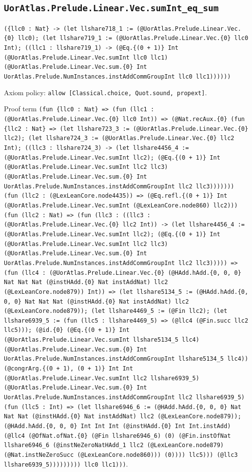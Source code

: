 \documentclass[11pt]{article}
\begin{document}
\subsection*{\texttt{UorAtlas.Prelude.Linear.Vec.sumInt\_eq\_sum}}
\noindent\texttt{(\{llc0 : Nat\} -> (let llshare718\_1 := (@UorAtlas.Prelude.Linear.Vec.\{0\} llc0); (let llshare719\_1 := (@UorAtlas.Prelude.Linear.Vec.\{0\} llc0 Int); ((llc1 : llshare719\_1) -> (@Eq.\{(0 + 1)\} Int (@UorAtlas.Prelude.Linear.Vec.sumInt llc0 llc1) (@UorAtlas.Prelude.Linear.Vec.sum.\{0\} Int UorAtlas.Prelude.NumInstances.instAddCommGroupInt llc0 llc1))))))}\par
\noindent Axiom policy: \texttt{allow [Classical.choice, Quot.sound, propext]}.\par
\noindent Proof term \texttt{(fun \{llc0 : Nat\} => (fun (llc1 : (@UorAtlas.Prelude.Linear.Vec.\{0\} llc0 Int)) => (@Nat.recAux.\{0\} (fun \{llc2 : Nat\} => (let llshare723\_3 := (@UorAtlas.Prelude.Linear.Vec.\{0\} llc2); (let llshare724\_3 := (@UorAtlas.Prelude.Linear.Vec.\{0\} llc2 Int); ((llc3 : llshare724\_3) -> (let llshare4456\_4 := (@UorAtlas.Prelude.Linear.Vec.sumInt llc2); (@Eq.\{(0 + 1)\} Int (@UorAtlas.Prelude.Linear.Vec.sumInt llc2 llc3) (@UorAtlas.Prelude.Linear.Vec.sum.\{0\} Int UorAtlas.Prelude.NumInstances.instAddCommGroupInt llc2 llc3))))))) (fun (llc2 : (@LexLeanCore.node4435)) => (@Eq.refl.\{(0 + 1)\} Int (@UorAtlas.Prelude.Linear.Vec.sumInt (@LexLeanCore.node860) llc2))) (fun (llc2 : Nat) => (fun (llc3 : ((llc3 : (@UorAtlas.Prelude.Linear.Vec.\{0\} llc2 Int)) -> (let llshare4456\_4 := (@UorAtlas.Prelude.Linear.Vec.sumInt llc2); (@Eq.\{(0 + 1)\} Int (@UorAtlas.Prelude.Linear.Vec.sumInt llc2 llc3) (@UorAtlas.Prelude.Linear.Vec.sum.\{0\} Int UorAtlas.Prelude.NumInstances.instAddCommGroupInt llc2 llc3))))) => (fun (llc4 : (@UorAtlas.Prelude.Linear.Vec.\{0\} (@HAdd.hAdd.\{0, 0, 0\} Nat Nat Nat (@instHAdd.\{0\} Nat instAddNat) llc2 (@LexLeanCore.node879)) Int)) => (let llshare5134\_5 := (@HAdd.hAdd.\{0, 0, 0\} Nat Nat Nat (@instHAdd.\{0\} Nat instAddNat) llc2 (@LexLeanCore.node879)); (let llshare4469\_5 := (@Fin llc2); (let llshare6939\_5 := (fun (llc5 : llshare4469\_5) => (@llc4 (@Fin.succ llc2 llc5))); (@id.\{0\} (@Eq.\{(0 + 1)\} Int (@UorAtlas.Prelude.Linear.Vec.sumInt llshare5134\_5 llc4) (@UorAtlas.Prelude.Linear.Vec.sum.\{0\} Int UorAtlas.Prelude.NumInstances.instAddCommGroupInt llshare5134\_5 llc4)) (@congrArg.\{(0 + 1), (0 + 1)\} Int Int (@UorAtlas.Prelude.Linear.Vec.sumInt llc2 llshare6939\_5) (@UorAtlas.Prelude.Linear.Vec.sum.\{0\} Int UorAtlas.Prelude.NumInstances.instAddCommGroupInt llc2 llshare6939\_5) (fun (llc5 : Int) => (let llshare6946\_6 := (@HAdd.hAdd.\{0, 0, 0\} Nat Nat Nat (@instHAdd.\{0\} Nat instAddNat) llc2 (@LexLeanCore.node879)); (@HAdd.hAdd.\{0, 0, 0\} Int Int Int (@instHAdd.\{0\} Int Int.instAdd) (@llc4 (@OfNat.ofNat.\{0\} (@Fin llshare6946\_6) (0) (@Fin.instOfNat llshare6946\_6 (@instNeZeroNatHAdd\_1 llc2 (@LexLeanCore.node879) (@Nat.instNeZeroSucc (@LexLeanCore.node860))) (0)))) llc5))) (@llc3 llshare6939\_5))))))))) llc0 llc1)))}.\par
\end{document}
